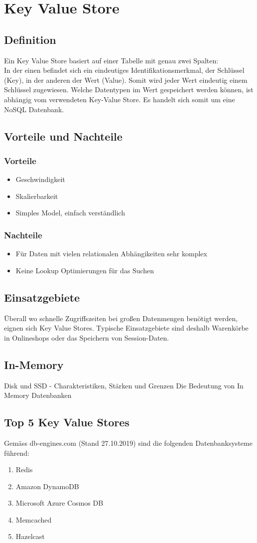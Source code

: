 \section{Key Value Store}
\subsection{Definition}
Ein Key Value Store basiert auf einer Tabelle mit genau zwei Spalten: \\
In der einen befindet sich ein eindeutiges Identifikationsmerkmal, der Schlüssel (Key), in der anderen der Wert (Value).
Somit wird jeder Wert eindeutig einem Schlüssel zugewiesen.
Welche Datentypen im Wert gespeichert werden können, ist abhängig vom verwendeten Key-Value Store.
Es handelt sich somit um eine NoSQL Datenbank.
\subsection{Vorteile und Nachteile}
\subsubsection{Vorteile}
\begin{itemize}
	\item Geschwindigkeit
	\item Skalierbarkeit
	\item Simples Model, einfach verständlich
\end{itemize}
\subsubsection{Nachteile}
\begin{itemize}
	\item Für Daten mit vielen relationalen Abhängikeiten sehr komplex
	\item Keine Lookup Optimierungen für das Suchen
\end{itemize}
\subsection{Einsatzgebiete}
Überall wo schnelle Zugriffszeiten bei großen Datenmengen benötigt werden, eignen sich Key Value Stores. Typische Einsatzgebiete sind deshalb Warenkörbe in Onlineshops oder das Speichern von Session-Daten.

\subsection{In-Memory}
Disk und SSD - Charakteristiken, Stärken und Grenzen
Die Bedeutung von In Memory Datenbanken

\subsection{Top 5 Key Value Stores}
Gemäss db-engines.com (Stand 27.10.2019) sind die folgenden Datenbanksysteme führend:
\begin{enumerate}
\item Redis
\item Amazon DynamoDB
\item Microsoft Azure Cosmos DB
\item Memcached
\item Hazelcast
\end{enumerate}
